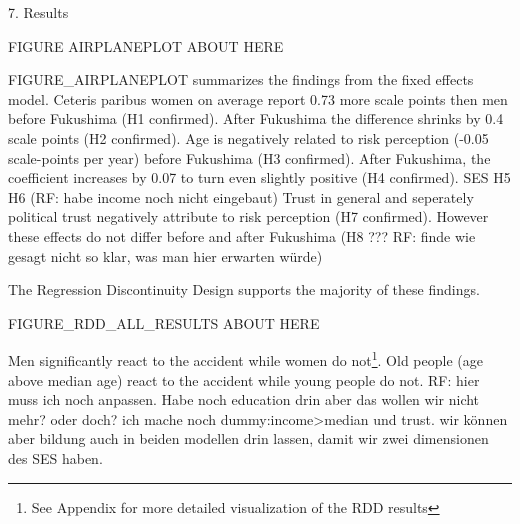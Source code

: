 {%



7. Results 

FIGURE AIRPLANEPLOT ABOUT HERE

FIGURE_AIRPLANEPLOT summarizes the findings from the fixed effects model. Ceteris paribus women on average report 0.73 more scale points then men before Fukushima (H1 confirmed). After Fukushima the difference shrinks by 0.4 scale points (H2 confirmed). 
Age is negatively related to risk perception (-0.05 scale-points per year) before Fukushima (H3 confirmed). After Fukushima, the coefficient increases by 0.07 to turn even slightly positive (H4 confirmed). 
SES H5 H6 (RF: habe income noch nicht eingebaut)
Trust in general and seperately political trust negatively attribute to risk perception (H7 confirmed). However these effects do not differ before and after Fukushima (H8 ??? RF: finde wie gesagt nicht so klar, was man hier erwarten würde)

The Regression Discontinuity Design supports the majority of these findings. 

FIGURE_RDD_ALL_RESULTS ABOUT HERE

Men significantly react to the accident while women do not\footnote{See Appendix for more detailed visualization of the RDD results}. Old people (age above median age) react to the accident while young people do not. RF: hier muss ich noch anpassen. Habe noch education drin aber das wollen wir nicht mehr? oder doch? ich mache noch dummy:income>median und trust. wir können aber bildung auch in beiden modellen drin lassen, damit wir zwei dimensionen des SES haben.


}
